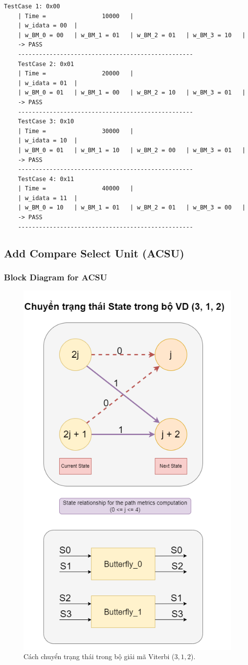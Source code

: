 \begin{lstlisting}[style=StyleResult, language=Result, caption={The Result of testing BMU.}]
	TestCase 1: 0x00
	| Time =                10000 	|
	| w_idata = 00 	|
	| w_BM_0 = 00 	| w_BM_1 = 01 	| w_BM_2 = 01 	| w_BM_3 = 10 	|
	-> PASS
	--------------------------------------------------
	TestCase 2: 0x01
	| Time =                20000 	|
	| w_idata = 01 	|
	| w_BM_0 = 01 	| w_BM_1 = 00 	| w_BM_2 = 10 	| w_BM_3 = 01 	|
	-> PASS
	--------------------------------------------------
	TestCase 3: 0x10
	| Time =                30000 	|
	| w_idata = 10 	|
	| w_BM_0 = 01 	| w_BM_1 = 10 	| w_BM_2 = 00 	| w_BM_3 = 01 	|
	-> PASS
	--------------------------------------------------
	TestCase 4: 0x11
	| Time =                40000 	|
	| w_idata = 11 	|
	| w_BM_0 = 10 	| w_BM_1 = 01 	| w_BM_2 = 01 	| w_BM_3 = 00 	|
	-> PASS
	--------------------------------------------------
\end{lstlisting}

\subsection{Add Compare Select Unit (ACSU)}

\subsubsection{Block Diagram for ACSU}

\begin{figure}[H]
	\centering
	\includegraphics[width=.6\linewidth]{sections/pic/mophongbangSystemVerilog/ACSU_proc_state.png}
	\caption{Cách chuyển trạng thái trong bộ giải mã Viterbi ($3, 1, 2$).}
\end{figure}

